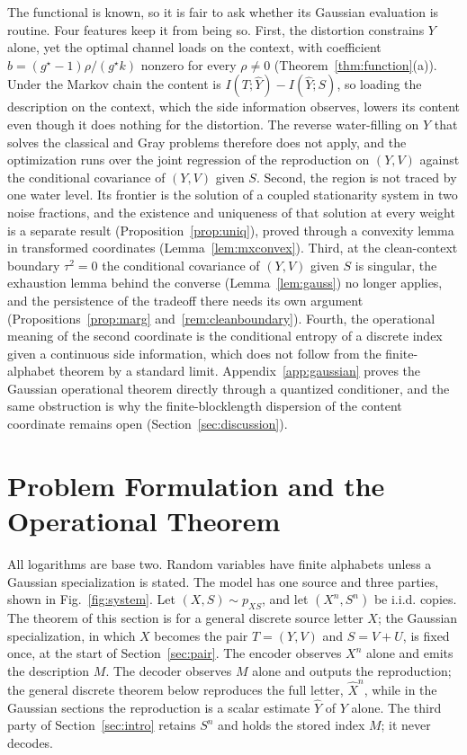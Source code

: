 \documentclass[11pt,onecolumn]{IEEEtran}
\newcommand{\hXn}{\widehat{X}^{n}}
\newcommand{\hY}{\widehat{Y}}
\begin{document}
The functional is known, so it is fair to ask whether its Gaussian
evaluation is routine. Four features keep it from being so. First, the
distortion constrains $Y$ alone, yet the optimal channel loads on the
context, with coefficient $b=(g^\star-1)\rho/(g^\star k)$ nonzero for every
$\rho\ne0$ (Theorem~\ref{thm:function}(a)). Under the Markov chain the
content is $I(T;\hY)-I(\hY;S)$, so loading the description on the context,
which the side information observes, lowers its content even though it
does nothing for the distortion. The reverse water-filling on $Y$ that
solves the classical and Gray problems therefore does not apply, and the
optimization runs over the joint regression of the reproduction on
$(Y,V)$ against the conditional covariance of $(Y,V)$ given $S$. Second,
the region is not traced by one water level. Its frontier is the solution
of a coupled stationarity system in two noise fractions, and the existence
and uniqueness of that solution at every weight is a separate result
(Proposition~\ref{prop:uniq}), proved through a convexity lemma in
transformed coordinates (Lemma~\ref{lem:mxconvex}). Third, at the
clean-context boundary $\tau^2=0$ the conditional covariance of $(Y,V)$ given
$S$ is singular, the exhaustion lemma behind the converse
(Lemma~\ref{lem:gauss}) no longer applies, and the persistence of the
tradeoff there needs its own argument (Propositions~\ref{prop:marg}
and~\ref{rem:cleanboundary}). Fourth, the operational meaning of the second
coordinate is the conditional entropy of a discrete index given a
continuous side information, which does not follow from the
finite-alphabet theorem by a standard limit. Appendix~\ref{app:gaussian}
proves the Gaussian operational theorem directly through a quantized
conditioner, and the same obstruction is why the finite-blocklength
dispersion of the content coordinate remains open
(Section~\ref{sec:discussion}).

\section{Problem Formulation and the Operational Theorem}
\label{sec:operational}

All logarithms are base two. Random variables have finite alphabets unless a
Gaussian specialization is stated. The model has one source and three
parties, shown in Fig.~\ref{fig:system}. Let $(X,S)\sim p_{XS}$, and let
$(X^n,S^n)$ be i.i.d. copies. The theorem of this section is for a
general discrete source letter $X$; the Gaussian specialization, in which
$X$ becomes the pair $T=(Y,V)$ and $S=V+U$, is fixed once, at the start
of Section~\ref{sec:pair}. The encoder observes $X^n$
alone and emits the description $M$. The decoder observes $M$ alone and
outputs the reproduction; the general discrete theorem below reproduces the
full letter, $\hXn$, while in the Gaussian sections the reproduction is a
scalar estimate $\hY$ of $Y$ alone. The third party of
Section~\ref{sec:intro} retains $S^n$ and holds the stored index $M$; it
never decodes.
\end{document}
